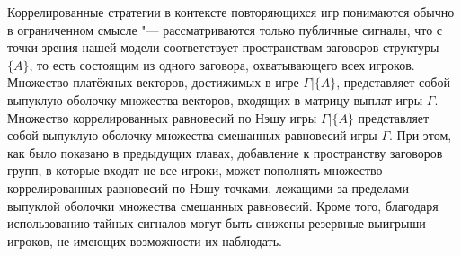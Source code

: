 Коррелированные стратегии в контексте повторяющихся игр понимаются обычно в ограниченном смысле "--- рассматриваются только публичные сигналы, что с точки зрения нашей модели соответствует пространствам заговоров структуры $\{A\}$, то есть состоящим из одного заговора, охватывающего всех игроков. Множество платёжных векторов, достижимых в игре $\Gamma | \{A\}$, представляет собой выпуклую оболочку множества векторов, входящих в матрицу выплат игры $\Gamma$. Множество коррелированных равновесий по Нэшу игры $\Gamma | \{A\}$ представляет собой выпуклую оболочку множества смешанных равновесий игры $\Gamma$. При этом, как было показано в предыдущих главах, добавление к пространству заговоров групп, в которые входят не все игроки, может пополнять множество коррелированных равновесий по Нэшу точками, лежащими за пределами выпуклой оболочки множества смешанных равновесий. Кроме того, благодаря использованию тайных сигналов могут быть снижены резервные выигрыши игроков, не имеющих возможности их наблюдать.

